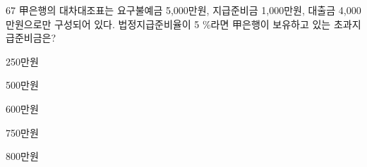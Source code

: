 \begin{question}{67}
甲은행의 대차대조표는 요구불예금 5,000만원, 지급준비금 1,000만원, 대출금 4,000만원으로만 구성되어 있다. 법정지급준비율이 5 \%라면 甲은행이 보유하고 있는 초과지급준비금은?
\begin{choices}
  \item 250만원
  \item 500만원
  \item 600만원
  \item 750만원
  \item 800만원
\end{choices}
\end{question}
